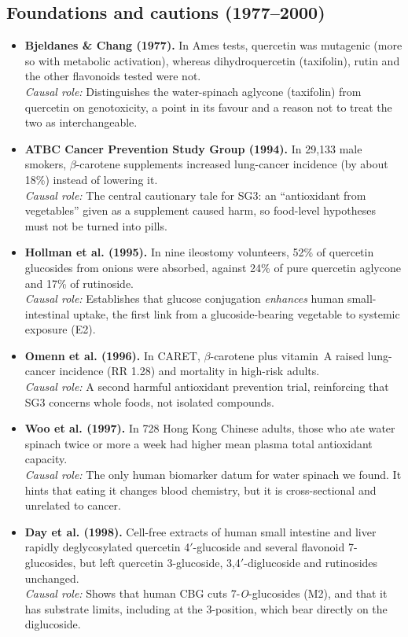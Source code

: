 \documentclass[11pt,a4paper]{article}
\newenvironment{litlist}{\begin{itemize}[leftmargin=2.6em,labelwidth=2.2em,labelsep=0.4em,align=left,itemsep=5pt,topsep=4pt]}{\end{itemize}}
\newcommand{\litentry}[4]{\item[\cite{#1}] \textbf{\color{navy}#2.} #3\\[1pt]
  {\color{teal}\textit{Causal role:}} #4}
\begin{document}
\subsection{Foundations and cautions (1977--2000)}
\begin{litlist}
\litentry{bjeldanes1977}{Bjeldanes \& Chang (1977)}{In Ames tests, quercetin was mutagenic (more so with metabolic activation), whereas dihydroquercetin (taxifolin), rutin and the other flavonoids tested were not.}{Distinguishes the water-spinach aglycone (taxifolin) from quercetin on genotoxicity, a point in its favour and a reason not to treat the two as interchangeable.}

\litentry{alphatocopherolbetac1994}{ATBC Cancer Prevention Study Group (1994)}{In 29{,}133 male smokers, $\beta$-carotene supplements increased lung-cancer incidence (by about 18\%) instead of lowering it.}{The central cautionary tale for SG3: an ``antioxidant from vegetables'' given as a supplement caused harm, so food-level hypotheses must not be turned into pills.}

\litentry{hollman1995}{Hollman et al. (1995)}{In nine ileostomy volunteers, 52\% of quercetin glucosides from onions were absorbed, against 24\% of pure quercetin aglycone and 17\% of rutinoside.}{Establishes that glucose conjugation \emph{enhances} human small-intestinal uptake, the first link from a glucoside-bearing vegetable to systemic exposure (E2).}

\litentry{omenn1996}{Omenn et al. (1996)}{In CARET, $\beta$-carotene plus vitamin~A raised lung-cancer incidence (RR 1.28) and mortality in high-risk adults.}{A second harmful antioxidant prevention trial, reinforcing that SG3 concerns whole foods, not isolated compounds.}

\litentry{woo1997}{Woo et al. (1997)}{In 728 Hong Kong Chinese adults, those who ate water spinach twice or more a week had higher mean plasma total antioxidant capacity.}{The only human biomarker datum for water spinach we found. It hints that eating it changes blood chemistry, but it is cross-sectional and unrelated to cancer.}

\litentry{day1998}{Day et al. (1998)}{Cell-free extracts of human small intestine and liver rapidly deglycosylated quercetin 4$'$-glucoside and several flavonoid 7-glucosides, but left quercetin 3-glucoside, 3,4$'$-diglucoside and rutinosides unchanged.}{Shows that human CBG cuts 7-\emph{O}-glucosides (M2), and that it has substrate limits, including at the 3-position, which bear directly on the diglucoside.}


\end{litlist}
\end{document}
